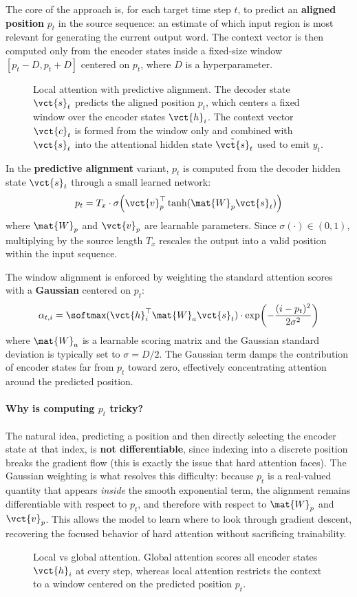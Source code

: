 The core of the approach is, for each target time step $t$, to predict an \textbf{aligned position} $p_t$ in the source sequence: an estimate of which input region is most relevant for generating the current output word.
The context vector is then computed only from the encoder states inside a fixed-size window $[p_t - D, p_t + D]$ centered on $p_t$, where $D$ is a hyperparameter.

\begin{figure}[H]
    \centering
    
    \caption{Local attention with predictive alignment. The decoder state $\vct{s}_t$ predicts the aligned position $p_t$, which centers a fixed window over the encoder states $\vct{h}_i$. The context vector $\vct{c}_t$ is formed from the window only and combined with $\vct{s}_t$ into the attentional hidden state $\tilde{\vct{s}}_t$ used to emit $y_t$.}
\end{figure}

In the \textbf{predictive alignment} variant, $p_t$ is computed from the decoder hidden state $\vct{s}_t$ through a small learned network:
\[
p_t = T_x \cdot \sigma\!\left(\vct{v}_p^\top \tanh(\mat{W}_p \vct{s}_t)\right)
\]
where $\mat{W}_p$ and $\vct{v}_p$ are learnable parameters.
Since $\sigma(\cdot) \in (0, 1)$, multiplying by the source length $T_x$ rescales the output into a valid position within the input sequence.

The window alignment is enforced by weighting the standard attention scores with a \textbf{Gaussian} centered on $p_t$:
\[
\alpha_{t,i} = \softmax(\vct{h}_i^\top \mat{W}_a \vct{s}_t) \cdot \exp\!\left(-\frac{(i - p_t)^2}{2\sigma^2}\right)
\]
where $\mat{W}_a$ is a learnable scoring matrix and the Gaussian standard deviation is typically set to $\sigma = D/2$.
The Gaussian term damps the contribution of encoder states far from $p_t$ toward zero, effectively concentrating attention around the predicted position.

\paragraph{Why is computing $p_t$ tricky?}
The natural idea, predicting a position and then directly selecting the encoder state at that index, is \textbf{not differentiable}, since indexing into a discrete position breaks the gradient flow (this is exactly the issue that hard attention faces).
The Gaussian weighting is what resolves this difficulty: because $p_t$ is a real-valued quantity that appears \textit{inside} the smooth exponential term, the alignment remains differentiable with respect to $p_t$, and therefore with respect to $\mat{W}_p$ and $\vct{v}_p$.
This allows the model to learn where to look through gradient descent, recovering the focused behavior of hard attention without sacrificing trainability.

\begin{figure}[H]
    \centering
    
    \caption{Local vs global attention. Global attention scores all encoder states $\vct{h}_i$ at every step, whereas local attention restricts the context to a window centered on the predicted position $p_t$.}
\end{figure}
